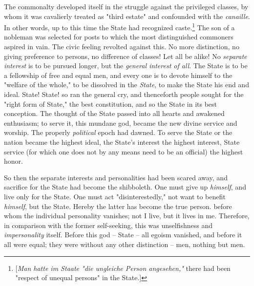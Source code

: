 \documentclass[a4paper]{book}
\begin{document}
The commonalty developed itself in the struggle against the privileged 
classes, by whom it was cavalierly treated as "{}third estate"{} and 
confounded with the \textit{canaille}. In other words, up to this time the 
State had recognized caste.\footnote{[\textit{Man hatte im Staate "{}die 
ungleiche Person angesehen,"{}} there had been "{}respect of unequal 
persons"{} in the State.]} The son of a nobleman was selected for posts to 
which the most distinguished commoners aspired in vain. The civic feeling 
revolted against this. No more distinction, no giving preference to persons, 
no difference of classes! Let all be alike! No \textit{separate interest} is 
to be pursued longer, but the \textit{general interest of all}. The State is 
to be a fellowship of free and equal men, and every one is to devote himself 
to the "{}welfare of the whole,"{} to be dissolved in the \textit{State}, to 
make the State his end and ideal. State! State! so ran the general cry, and 
thenceforth people sought for the "{}right form of State,"{} the best 
constitution, and so the State in its best conception. The thought of the 
State passed into all hearts and awakened enthusiasm; to serve it, this 
mundane god, became the new divine service and worship. The properly 
\textit{political} epoch had dawned. To serve the State or the nation became 
the highest ideal, the State's interest the highest interest, State service 
(for which one does not by any means need to be an official) the highest 
honor.

So then the separate interests and personalities had been scared away, and 
sacrifice for the State had become the shibboleth. One must give up 
\textit{himself}, and live only for the State. One must act 
"{}disinterestedly,"{} not want to benefit \textit{himself}, but the State. 
Hereby the latter has become the true person. before whom the individual 
personality vanishes; not I live, but it lives in me. Therefore, in comparison 
with the former self-seeking, this was unselfishness and 
\textit{impersonality} itself. Before this god -- State -- all egoism 
vanished, and before it all were equal; they were without any other 
distinction -- men, nothing but men.
\end{document}
